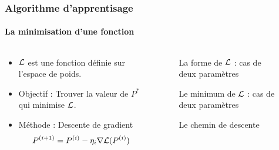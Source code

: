 \begin{frame}
\frametitle{Algorithme d'apprentisage}
\framesubtitle{La minimisation d'une fonction}
\begin{columns}
    \begin{column}{6cm}
        \begin{itemize}
            \item<1->   ${\mathcal L}$ est une fonction définie sur l'espace de poids.
            \item<2->   Objectif : Trouver la valeur de $P^{*}$ qui minimise ${\mathcal L}$.
            \item<3->   Méthode : Descente de gradient $$ P^{(i+1)}=P^{(i)} - {\eta}_i \nabla {\mathcal L} (P^{(i)}) $$
        \end{itemize}
    \end{column}
    \begin{column}{6cm}
    \begin{figure}
        \begin{overprint}
            \caption{La forme de ${\mathcal L}$ : cas de deux paramètres}
            \caption{Le minimum de ${\mathcal L}$ : cas de deux paramètres}
            \caption{Le chemin de descente}
        \end{overprint}
    \end{figure}
    \end{column}
\end{columns}
\end{frame}